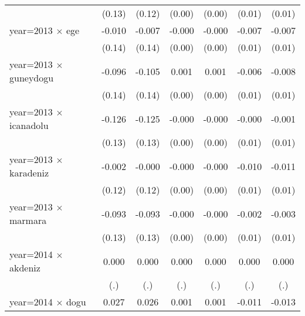 {\begin{tabular}{l*{6}{c}}
                    &      (0.13)         &      (0.12)         &      (0.00)         &      (0.00)         &      (0.01)         &      (0.01)         \\
year=2013 $\times$ ege&      -0.010         &      -0.007         &      -0.000         &      -0.000         &      -0.007         &      -0.007         \\
                    &      (0.14)         &      (0.14)         &      (0.00)         &      (0.00)         &      (0.01)         &      (0.01)         \\
year=2013 $\times$ guneydogu&      -0.096         &      -0.105         &       0.001         &       0.001         &      -0.006         &      -0.008         \\
                    &      (0.14)         &      (0.14)         &      (0.00)         &      (0.00)         &      (0.01)         &      (0.01)         \\
year=2013 $\times$ icanadolu&      -0.126         &      -0.125         &      -0.000         &      -0.000         &      -0.000         &      -0.001         \\
                    &      (0.13)         &      (0.13)         &      (0.00)         &      (0.00)         &      (0.01)         &      (0.01)         \\
year=2013 $\times$ karadeniz&      -0.002         &      -0.000         &      -0.000         &      -0.000         &      -0.010         &      -0.011         \\
                    &      (0.12)         &      (0.12)         &      (0.00)         &      (0.00)         &      (0.01)         &      (0.01)         \\
year=2013 $\times$ marmara&      -0.093         &      -0.093         &      -0.000         &      -0.000         &      -0.002         &      -0.003         \\
                    &      (0.13)         &      (0.13)         &      (0.00)         &      (0.00)         &      (0.01)         &      (0.01)         \\
year=2014 $\times$ akdeniz&       0.000         &       0.000         &       0.000         &       0.000         &       0.000         &       0.000         \\
                    &         (.)         &         (.)         &         (.)         &         (.)         &         (.)         &         (.)         \\
year=2014 $\times$ dogu&       0.027         &       0.026         &       0.001         &       0.001         &      -0.011         &      -0.013         \\

\end{tabular}}
